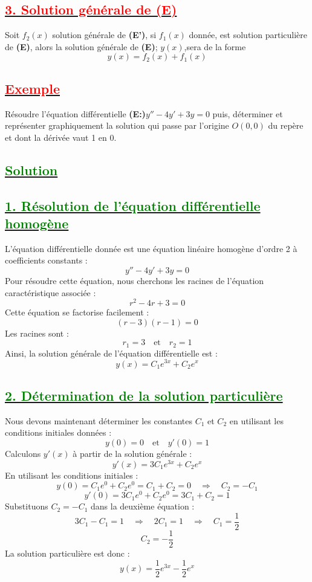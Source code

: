 \documentclass{article}
\begin{document}
\subsection*{\underline{\textbf{\textcolor{red}{3. Solution générale de (E)}}}}
Soit $f_{2}(x)$ solution générale de \textbf{(E')}, si $f_{1}(x)$ donnée, est solution particulière de \textbf{(E)}, alors la solution générale de \textbf{(E)}; $y(x)$,sera de la forme \[y(x)=f_{2}(x)+f_{1}(x) \]
\subsection*{\underline{\textbf{\textcolor{red}{Exemple}}}}
Résoudre l'équation différentielle \textbf{(E:)}$y''-4y'+3y=0$ puis, déterminer et représenter graphiquement la solution qui passe par l'origine $O(0,0)$ du repère et dont la dérivée vaut 1 en 0.
\subsection*{\underline{\textbf{\textcolor{green}{Solution}}}}
\subsection*{\underline{\textbf{\textcolor{green}{1. Résolution de l'équation différentielle homogène}}}}
L'équation différentielle donnée est une équation linéaire homogène d'ordre 2 à coefficients constants :
\[
y'' - 4y' + 3y = 0
\]
Pour résoudre cette équation, nous cherchons les racines de l'équation caractéristique associée :
\[
r^2 - 4r + 3 = 0
\]
Cette équation se factorise facilement :
\[
(r - 3)(r - 1) = 0
\]
Les racines sont :
\[
r_1 = 3 \quad \text{et} \quad r_2 = 1
\]
Ainsi, la solution générale de l'équation différentielle est :
\[
y(x) = C_1 e^{3x} + C_2 e^x
\]

\subsection*{\underline{\textbf{\textcolor{green}{2. Détermination de la solution particulière}}}}
Nous devons maintenant déterminer les constantes $C_1$ et $C_2$ en utilisant les conditions initiales données :
\[
y(0) = 0 \quad \text{et} \quad y'(0) = 1
\]
Calculons $y'(x)$ à partir de la solution générale :
\[
y'(x) = 3C_1 e^{3x} + C_2 e^x
\]
En utilisant les conditions initiales :
\[
y(0) = C_1 e^0 + C_2 e^0 = C_1 + C_2 = 0 \quad \Rightarrow \quad C_2 = -C_1
\]
\[
y'(0) = 3C_1 e^0 + C_2 e^0 = 3C_1 + C_2 = 1
\]
Substituons $C_2 = -C_1$ dans la deuxième équation :
\[
3C_1 - C_1 = 1 \quad \Rightarrow \quad 2C_1 = 1 \quad \Rightarrow \quad C_1 = \frac{1}{2}
\]
\[
C_2 = -\frac{1}{2}
\]
La solution particulière est donc :
\[
y(x) = \frac{1}{2} e^{3x} - \frac{1}{2} e^x
\]
\end{document}
